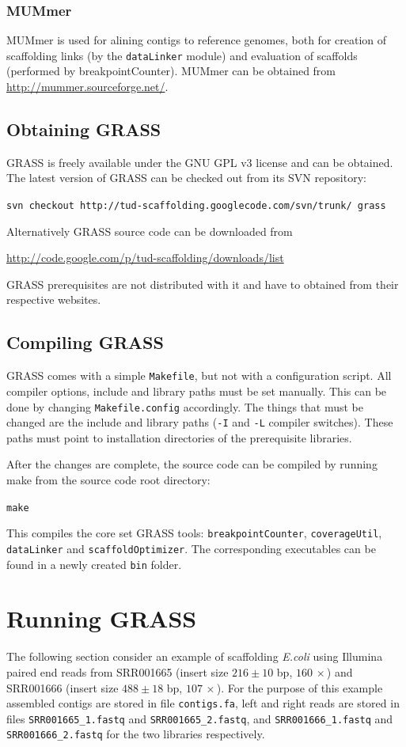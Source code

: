 \documentclass[12pt, a4paper]{report}
\begin{document}
\subsection{MUMmer}
MUMmer is used for alining contigs to reference genomes, both for creation of scaffolding links (by the \verb=dataLinker= module) and evaluation of scaffolds (performed by breakpointCounter). MUMmer can be obtained from \url{http://mummer.sourceforge.net/}.

\section{Obtaining GRASS}
GRASS is freely available under the GNU GPL v3 license and can be obtained. The latest version of GRASS can be checked out from its SVN repository:
\begin{center}
\verb=svn checkout http://tud-scaffolding.googlecode.com/svn/trunk/ grass=
\end{center}
Alternatively GRASS source code can be downloaded from
\begin{center}
\url{http://code.google.com/p/tud-scaffolding/downloads/list}
\end{center}
GRASS prerequisites are not distributed with it and have to obtained from their respective websites.

\section{Compiling GRASS}
GRASS comes with a simple \verb=Makefile=, but not with a configuration script. All compiler options, include and library paths must be set manually. This can be done by changing \verb=Makefile.config= accordingly. The things that must be changed are the include and library paths (\verb=-I= and \verb=-L= compiler switches). These paths must point to installation directories of the prerequisite libraries.

After the changes are complete, the source code can be compiled by running make from the source code root directory:
\begin{center}
\verb=make=
\end{center}
This compiles the core set GRASS tools: \verb=breakpointCounter=, \verb=coverageUtil=, \verb=dataLinker= and \verb=scaffoldOptimizer=. The corresponding executables can be found in a newly created \verb=bin= folder.

\chapter{Running GRASS}
The following section consider an example of scaffolding \emph{E.coli} using Illumina paired end reads from SRR001665 (insert size $216\pm10$ bp, $160\,\times$) and SRR001666 (insert size $488\pm18$ bp, $107\,\times$). For the purpose of this example assembled contigs are stored in file \verb=contigs.fa=, left and right reads are stored in files \verb=SRR001665_1.fastq= and \verb=SRR001665_2.fastq=, and \verb=SRR001666_1.fastq= and \verb=SRR001666_2.fastq= for the two libraries respectively.
\end{document}
